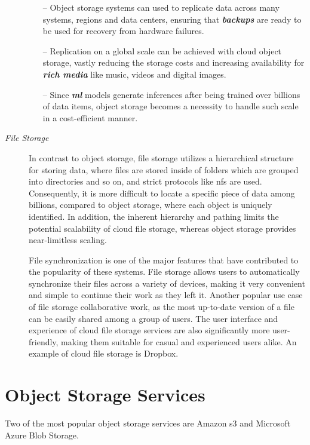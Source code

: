 \begin{description}
\begin{itemize}
		\item [--] Object storage systems can used to replicate data across many  systems, regions and data centers, ensuring that \textbf{\textit{backups}} are ready to be used for recovery from hardware failures.
		
		\item [--] Replication on a global scale can be achieved with cloud object storage, vastly reducing the storage costs and increasing availability for \textit{\textbf{rich media}} like music, videos and digital images.  
		
		\item [--]  Since \textit{\textbf{ \ac{ml}}} models generate inferences after being trained over billions of data items, object storage becomes a necessity to handle such scale in a cost-efficient manner.
	\end{itemize}

	\item[\textit{File Storage}] In contrast to object storage, file storage utilizes a hierarchical structure for storing data, where files are stored inside of folders which are grouped into directories and so on, and strict protocols like \ac{nfs} are used. Consequently, it is more difficult to locate a specific piece of data among billions, compared to object storage, where each object is uniquely identified. In addition, the inherent hierarchy and pathing limits the potential scalability of cloud file storage, whereas object storage provides near-limitless scaling.
	
	File synchronization is one of the major features that have contributed to the popularity of these systems. File storage allows users to automatically synchronize their files across a variety of devices, making it very convenient and simple to continue their work as they left it. Another popular use case of file storage collaborative work, as the most up-to-date version of a file can be easily shared among a group of users.\cite{personal1} The user interface and experience of cloud file storage services are also significantly more user-friendly, making them suitable for casual and experienced users alike. An example of cloud file storage is Dropbox. \cite{dropbox}
\end{description}

\section{Object Storage Services}
Two of the most popular object storage services are Amazon \ac{s3} and Microsoft Azure Blob Storage. \cite{s3,blob}

